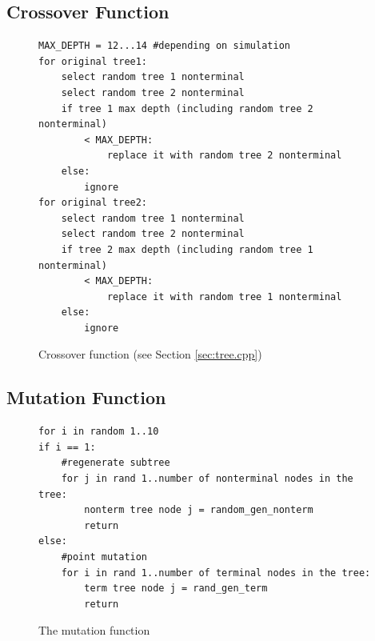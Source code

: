 \documentclass[12pt]{article}
\begin{document}
\subsection{Crossover Function}
\label{sec:crossover}
\begin{figure}[!h]
        \begin{center}
		\begin{lstlisting}
MAX_DEPTH = 12...14 #depending on simulation
for original tree1:
	select random tree 1 nonterminal
	select random tree 2 nonterminal
	if tree 1 max depth (including random tree 2 nonterminal) 
		< MAX_DEPTH:
			replace it with random tree 2 nonterminal
	else:
		ignore
for original tree2:
	select random tree 1 nonterminal
	select random tree 2 nonterminal
	if tree 2 max depth (including random tree 1 nonterminal) 
		< MAX_DEPTH:
			replace it with random tree 1 nonterminal
	else:
		ignore
		\end{lstlisting}
               \caption{Crossover function (see Section \ref{sec:tree.cpp})}
                \label{fit_func}
        \end{center}
\end{figure}

\pagebreak

\subsection{Mutation Function}
\label{sec:mutation}
\begin{figure}[!h]
        \begin{center}
		\scriptsize
		\begin{lstlisting}
for i in random 1..10
if i == 1:
	#regenerate subtree
	for j in rand 1..number of nonterminal nodes in the tree:
		nonterm tree node j = random_gen_nonterm
		return
else:
	#point mutation
	for i in rand 1..number of terminal nodes in the tree:
		term tree node j = rand_gen_term
		return
		\end{lstlisting}
		\normalsize
               \caption{The mutation function}
                \label{mut_func}
        \end{center}
\end{figure}
\end{document}

